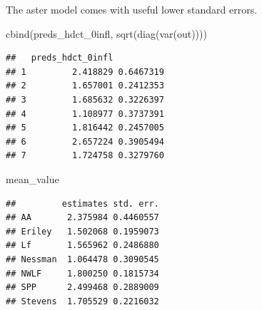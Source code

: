 \documentclass[
  ignorenonframetext,
]{beamer}
\newenvironment{Shaded}{\begin{snugshade}}{\end{snugshade}}
\newcommand{\FunctionTok}[1]{\textcolor[rgb]{0.00,0.00,0.00}{#1}}
\newcommand{\NormalTok}[1]{#1}
\begin{document}
\begin{frame}[fragile]{}
\protect\hypertarget{section-47}{}
The aster model comes with useful lower standard errors.

\vspace{12pt}
\tiny

\begin{Shaded}
\begin{Highlighting}[]
\FunctionTok{cbind}\NormalTok{(preds\_hdct\_0infl, }\FunctionTok{sqrt}\NormalTok{(}\FunctionTok{diag}\NormalTok{(}\FunctionTok{var}\NormalTok{(out))))}
\end{Highlighting}
\end{Shaded}

\begin{verbatim}
##   preds_hdct_0infl          
## 1         2.418829 0.6467319
## 2         1.657001 0.2412353
## 3         1.685632 0.3226397
## 4         1.108977 0.3737391
## 5         1.816442 0.2457005
## 6         2.657224 0.3905494
## 7         1.724758 0.3279760
\end{verbatim}

\begin{Shaded}
\begin{Highlighting}[]
\NormalTok{mean\_value}
\end{Highlighting}
\end{Shaded}

\begin{verbatim}
##         estimates std. err.
## AA       2.375984 0.4460557
## Eriley   1.502068 0.1959073
## Lf       1.565962 0.2486880
## Nessman  1.064478 0.3090545
## NWLF     1.800250 0.1815734
## SPP      2.499468 0.2889009
## Stevens  1.705529 0.2216032
\end{verbatim}
\end{frame}
\end{document}
